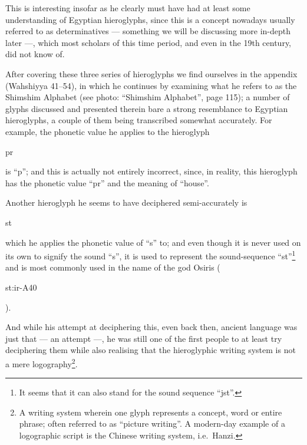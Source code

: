 \documentclass[a5paper,twoside,11pt]{report}
\begin{document}
	This is interesting insofar as he clearly must have had at least some understanding of Egyptian hieroglyphs, since this is a concept nowadays usually referred to as determinatives — something we will be discussing more in-depth later —, which most scholars of this time period, and even in the 19th century, did not know of.

	After covering these three series of hieroglyphs we find ourselves in the appendix (Wahshiyya 41–54), in which he continues by examining what he refers to as the Shimshim Alphabet (see photo: “Shimshim Alphabet”, page 115); a number of glyphs discussed and presented therein bare a strong resemblance to Egyptian hieroglyphs, a couple of them being transcribed somewhat accurately. For example, the phonetic value he applies to the hieroglyph \begin{hieroglyph}pr\end{hieroglyph} is “p”; and this is actually not entirely incorrect, since, in reality, this hieroglyph has the phonetic value “pr” and the meaning of “house”.

	Another hieroglyph he seems to have deciphered semi-accurately is \begin{hieroglyph}st\end{hieroglyph} which he applies the phonetic value of “s” to; and even though it is never used on its own to signify the sound “s”, it is used to represent the sound-sequence “st”\footnote{It seems that it can also stand for the sound sequence “jst”.} and is most commonly used in the name of the god Osiris (\begin{hieroglyph}st:ir-A40\end{hieroglyph}).

	And while his attempt at deciphering this, even back then, ancient language was just that — an attempt —, he was still one of the first people to at least try deciphering them while also realising that the hieroglyphic writing system is not a mere logography\footnote{A writing system wherein one glyph represents a concept, word or entire phrase; often referred to as “picture writing”. A modern-day example of a logographic script is the Chinese writing system, i.e.\ Hanzi.}. 
\end{document}
